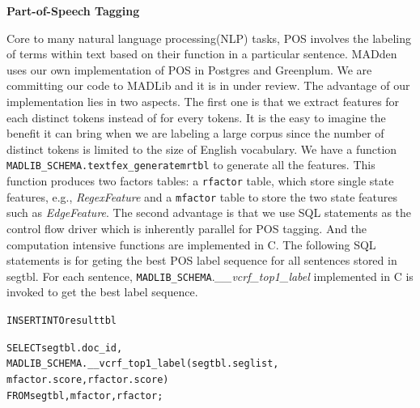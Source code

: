 \noindent
\textbf{Part-of-Speech Tagging}\\


Core to many natural language processing(NLP) tasks, POS involves the
labeling of terms within text based on their function in a particular sentence.
MADden uses our own implementation of POS in Postgres and Greenplum. We are
committing our code to MADLib and it is in under review. The advantage of our
implementation lies in two aspects. The first one is that we extract features
for each distinct tokens instead of for every tokens.  It is the easy to imagine
the benefit it can bring when we are labeling a large corpus since the number of
distinct tokens is limited to the size of English vocabulary. We have a function
{\tt MADLIB\_SCHEMA.textfex\_generatemrtbl} to generate all the features. This
function produces two factors tables: a {\tt rfactor} table, which store single
state features, e.g., \textit{RegexFeature} and a {\tt mfactor} table to store
the two state features such as \textit{EdgeFeature}.  The second advantage is
that we use SQL statements as the control flow driver which is inherently
parallel for POS tagging. And the computation intensive functions are
implemented in C. The following SQL statements is for geting the best POS label 
sequence for all sentences stored in segtbl. For each sentence,
{\tt MADLIB\_SCHEMA}.\textit{\_\_vcrf\_top1\_label} implemented in
C is invoked to get the best label sequence.


\begin{small}
\begin{alltt}
INSERT INTO resulttbl

SELECT segtbl.doc\_id, 
       MADLIB\_SCHEMA.\_\_vcrf\_top1\_label(segtbl.seglist,
                                            mfactor.score, rfactor.score)
FROM   segtbl, mfactor, rfactor;

\end{alltt}
\end{small}

